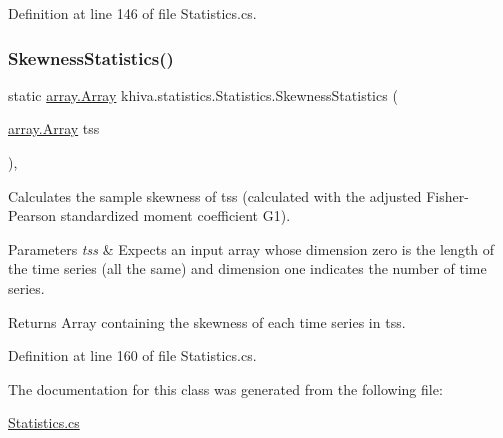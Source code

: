Definition at line 146 of file Statistics.\+cs.

\mbox{\label{classkhiva_1_1statistics_1_1_statistics_a2b1bc2a41eff99f2900e7cca95b28fbb}} 
\subsubsection{\texorpdfstring{Skewness\+Statistics()}{SkewnessStatistics()}}
{\footnotesize\ttfamily static \mbox{\hyperlink{classkhiva_1_1array_1_1_array}{array.\+Array}} khiva.\+statistics.\+Statistics.\+Skewness\+Statistics (\begin{DoxyParamCaption}\item[{\mbox{\hyperlink{classkhiva_1_1array_1_1_array}{array.\+Array}}}]{tss }\end{DoxyParamCaption})\hspace{0.3cm}{\ttfamily [inline]}, {\ttfamily [static]}}



Calculates the sample skewness of tss (calculated with the adjusted Fisher-\/\+Pearson standardized moment coefficient G1). 


\begin{DoxyParams}{Parameters}
{\em tss} & Expects an input array whose dimension zero is the length of the time series (all the same) and dimension one indicates the number of time series.\\
\hline
\end{DoxyParams}
\begin{DoxyReturn}{Returns}
Array containing the skewness of each time series in tss.
\end{DoxyReturn}


Definition at line 160 of file Statistics.\+cs.



The documentation for this class was generated from the following file\+:\begin{DoxyCompactItemize}
\item 
\mbox{\hyperlink{_statistics_8cs}{Statistics.\+cs}}\end{DoxyCompactItemize}

